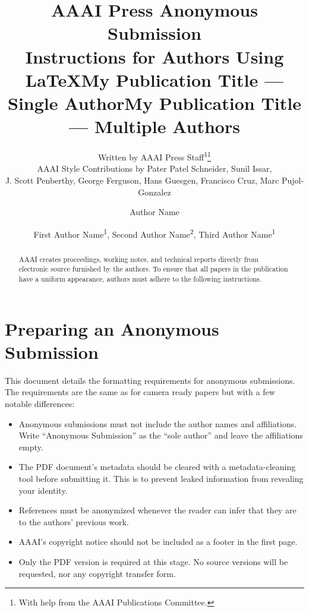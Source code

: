 \documentclass[letterpaper]{article} %
\title{AAAI Press Anonymous Submission\\Instructions for Authors Using \LaTeX{}}
\author{
    Written by AAAI Press Staff\textsuperscript{\rm 1}\thanks{With help from the AAAI Publications Committee.}\\
    AAAI Style Contributions by Pater Patel Schneider,
    Sunil Issar,\\
    J. Scott Penberthy,
    George Ferguson,
    Hans Guesgen,
    Francisco Cruz\equalcontrib,
    Marc Pujol-Gonzalez\equalcontrib
}
\title{My Publication Title --- Single Author}
\author {
    Author Name
}
\title{My Publication Title --- Multiple Authors}
\author {
    First Author Name\textsuperscript{\rm 1},
    Second Author Name\textsuperscript{\rm 2},
    Third Author Name\textsuperscript{\rm 1}
}
\begin{document}
\maketitle

\begin{abstract}
AAAI creates proceedings, working notes, and technical reports directly from electronic source furnished by the authors. To ensure that all papers in the publication have a uniform appearance, authors must adhere to the following instructions.
\end{abstract}


\section{Preparing an Anonymous Submission}

This document details the formatting requirements for anonymous submissions. The requirements are the same as for camera ready papers but with a few notable differences:

\begin{itemize}
    \item Anonymous submissions must not include the author names and affiliations. Write ``Anonymous Submission'' as the ``sole author'' and leave the affiliations empty.
    \item The PDF document's metadata should be cleared with a metadata-cleaning tool before submitting it. This is to prevent leaked information from revealing your identity.
    \item References must be anonymized whenever the reader can infer that they are to the authors' previous work.
    \item AAAI's copyright notice should not be included as a footer in the first page.
    \item Only the PDF version is required at this stage. No source versions will be requested, nor any copyright transfer form.
\end{itemize}
\end{document}
